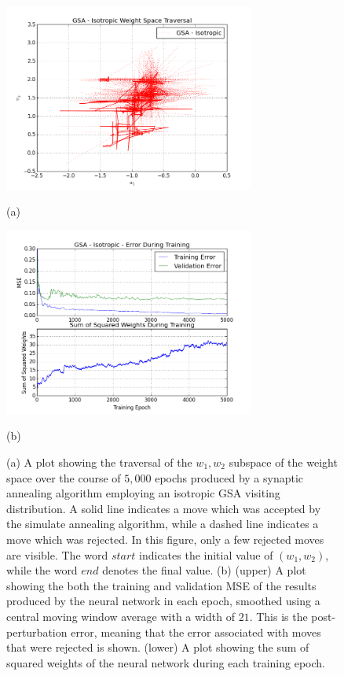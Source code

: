 \documentclass[11pt]{afthesis}
\begin{document}
   	\begin{figure}[ht!]
   		
   		\begin{minipage}[b]{0.5\linewidth}
   			\centering
   			\centerline{\includegraphics[width = 3.25in]{figures/weight_space_gsa_i.png}}
   			\centerline{(a)}\medskip
   		\end{minipage}
   		\hfill
   		\begin{minipage}[b]{0.5\linewidth}
   			\centering
   			\centerline{\includegraphics[width = 3.25in]{figures/weight_space_gsa_i_perf.png}}
   			\centerline{(b)}\medskip
   		\end{minipage}
   		\caption{
   			(a) A plot showing the traversal of the $w_1,w_2$ subspace of the weight space over the course of $5,000$ epochs produced by a synaptic annealing algorithm employing an isotropic GSA visiting distribution. A solid line indicates a move which was accepted by the simulate annealing algorithm, while a dashed line indicates a move which was rejected. In this figure, only a few rejected moves are visible. The word $start$ indicates the initial value of $(w_1,w_2)$, while the word $end$ denotes the final value. 
   			(b) (upper) A plot showing the both the training and validation MSE of the results produced by the neural network in each epoch, smoothed using a central moving window average with a width of $21$. This is the post-perturbation error, meaning that the error associated with moves that were rejected is shown. (lower) A plot showing the sum of squared weights of the neural network during each training epoch.}
   		\label{fig:weight_space_gsa_i}
   		
   	\end{figure}
	   	
\end{document}
